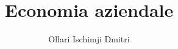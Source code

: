 \documentclass[a4paper]{report}
\title{Economia aziendale}
\author{Ollari Ischimji Dmitri}
\begin{document}
    \begin{titlepage}
        \maketitle
    \end{titlepage}

    \tableofcontents



    
    
\end{document}
